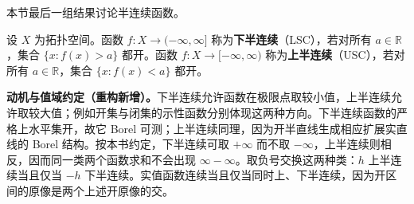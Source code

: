 \documentclass[../../main.tex]{subfiles}
\begin{document}
本节最后一组结果讨论半连续函数。
\begin{definition}[下半连续与上半连续]\label{definition:ch07-semicontinuity}
设 $X$ 为拓扑空间。函数 $f:X\to(-\infty,\infty]$ 称为\textbf{下半连续}（LSC），若对所有 $a\in\mathbb R$，集合 $\{x:f(x)>a\}$ 都开。函数 $f:X\to[-\infty,\infty)$ 称为\textbf{上半连续}（USC），若对所有 $a\in\mathbb R$，集合 $\{x:f(x)<a\}$ 都开。
\end{definition}
\begin{remark}
\textbf{动机与值域约定（重构新增）。}下半连续允许函数在极限点取较小值，上半连续允许取较大值；例如开集与闭集的示性函数分别体现这两种方向。下半连续函数的严格上水平集开，故它 Borel 可测；上半连续同理，因为开半直线生成相应扩展实直线的 Borel 结构。按本书约定，下半连续可取 $+\infty$ 而不取 $-\infty$，上半连续则相反，因而同一类两个函数求和不会出现 $\infty-\infty$。取负号交换这两种类：$h$ 上半连续当且仅当 $-h$ 下半连续。实值函数连续当且仅当同时上、下半连续，因为开区间的原像是两个上述开原像的交。
\end{remark}
\end{document}
